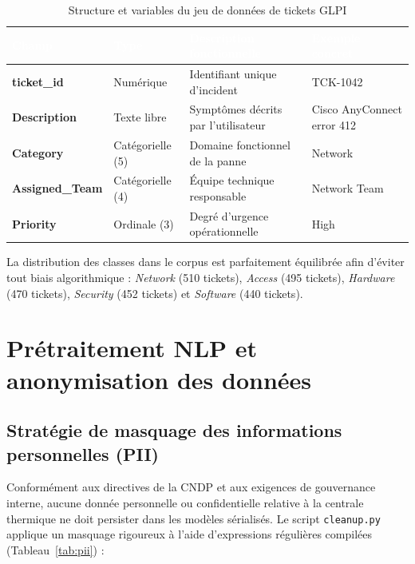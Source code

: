 \documentclass[12pt, a4paper, oneside]{report}
\begin{document}
\begin{table}[H]
\centering
\caption{Structure et variables du jeu de données de tickets GLPI}
\label{tab:dataset}
\begin{tabularx}{\textwidth}{|>{\bfseries}p{3cm}|p{2.5cm}|p{5cm}|X|}
\hline
\rowcolor{themeDark}
\textcolor{white}{Champ} &
\textcolor{white}{Type} &
\textcolor{white}{Description fonctionnelle} &
\textcolor{white}{Exemple concret} \\
\hline
ticket\_id & Numérique & Identifiant unique d'incident & TCK-1042 \\
\hline
Description & Texte libre & Symptômes décrits par l'utilisateur & Cisco AnyConnect error 412 \\
\hline
Category & Catégorielle (5) & Domaine fonctionnel de la panne & Network \\
\hline
Assigned\_Team & Catégorielle (4) & Équipe technique responsable & Network Team \\
\hline
Priority & Ordinale (3) & Degré d'urgence opérationnelle & High \\
\hline
\end{tabularx}
\end{table}

\begin{remarque}
La distribution des classes dans le corpus est parfaitement équilibrée afin d'éviter tout biais algorithmique : \textit{Network} (510 tickets), \textit{Access} (495 tickets), \textit{Hardware} (470 tickets), \textit{Security} (452 tickets) et \textit{Software} (440 tickets).
\end{remarque}

\section{Prétraitement NLP et anonymisation des données}

\subsection{Stratégie de masquage des informations personnelles (PII)}

Conformément aux directives de la CNDP et aux exigences de gouvernance interne, aucune donnée personnelle ou confidentielle relative à la centrale thermique ne doit persister dans les modèles sérialisés. Le script \texttt{cleanup.py} applique un masquage rigoureux à l'aide d'expressions régulières compilées (Tableau~\ref{tab:pii}) :
\end{document}
